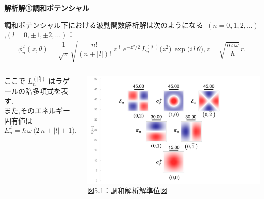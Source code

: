 \documentclass{beamer}
\begin{document}
  \begin{frame}{}
  \textbf{解析解①\quad 調和ポテンシャル}

          調和ポテンシャル下における波動関数解析解は次のようになる\ $(n = 0,1,2,\dots)$,$(l = 0,\pm1,\pm2,\dots)$：
              \vspace{-0.0em}       
        \begin{equation*}
        \phi_{n}^{\,l}(z,\theta)
        = \frac{1}{\sqrt{\pi}}
        \sqrt{\frac{n!}{(n + |l|)!}}\,
        z^{\,|l|}\,e^{-z^2/2}\,
        L_{n}^{(|l|)}\bigl(z^2\bigr)\,
        \exp\bigl(i\,l\,\theta\bigr),
        z = \sqrt{\frac{m\,\omega}{\hbar}}\,r.
        \end{equation*}
        
            \vspace{-2.5em}        

        \begin{columns}
          ここで $L_{n}^{(|l|)}$ はラゲールの陪多項式を表す.\\

          また,そのエネルギー固有値は
          \begin{equation*}
          E_{n}^{\,l} = \hbar\,\omega\,\bigl(2\,n + |l| + 1\bigr).
          \end{equation*}

          \begin{center}
            \includegraphics[width=1.4\linewidth]{images/調和準位図.png} \\
            \vspace{0.5em}
            {\small 図5.1：調和解析解準位図}
          \end{center}
        \end{columns}

        
  
  \end{frame}
  
\end{document}
